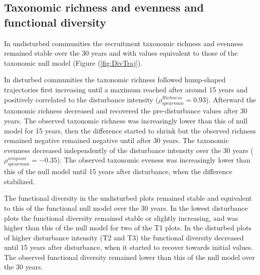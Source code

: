 \documentclass[fleqn,10pt]{ArtEcoFoG} %
\begin{document}
\subsection{Taxonomic richness and evenness and functional
diversity}\label{taxonomic-richness-and-evenness-and-functional-diversity}

In undisturbed communities the recruitment taxonomic richness and
evenness remained stable over the 30 years and with values equivalent to
those of the taxonomic null model (Figure (\ref{fig:DivTraj}).

In disturbed communities the taxonomic richness followed hump-shaped
trajectories first increasing until a maximum reached after around 15
years and positively correlated to the disturbance intensity
(\(\rho^{Richness}_{spearman}=0.93\)). Afterward the taxonomic richness
decreased and recovered the pre-disturbance values after 30 years. The
observed taxonomic richness was increasingly lower than this of null
model for 15 years, then the difference started to shrink but the
observed richness remained negative remained negative until after 30
years. The taxonomic evenness decreased independently of the disturbance
intensity over the 30 years (\(\rho^{simpson}_{spearman}=-0.35\)). The
observed taxonomic eveness was increasingly lower than this of the null
model until 15 years after disturbance, when the difference stabilized.

The functional diversity in the undisturbed plots remained stable and
equivalent to this of the functional null model over the 30 years. In
the lowest disturbance plots the functional diversity remained stable or
slightly increasing, and was higher than this of the null model for two
of the T1 plots. In the disturbed plots of higher disturbance intensity
(T2 and T3) the functional diversity decreased until 15 years after
disturbance, when it started to recover towards initial values. The
observed functional diversity remained lower than this of the null model
over the 30 years.
\end{document}
